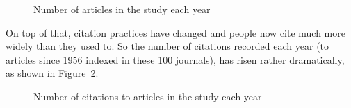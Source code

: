 \documentclass[
  10pt,
  letterpaper,
  DIV=11,
  numbers=noendperiod,
  twoside]{scrartcl}
\begin{document}
\begin{figure}


\caption{\label{fig-number-of-articles-by-year}Number of articles in the
study each year}

\end{figure}%

On top of that, citation practices have changed and people now cite much
more widely than they used to. So the number of citations recorded each
year (to articles since 1956 indexed in these 100 journals), has risen
rather dramatically, as shown in
Figure~\ref{fig-number-of-citations-by-year}.

\begin{figure}


\caption{\label{fig-number-of-citations-by-year}Number of citations to
articles in the study each year}

\end{figure}%
\end{document}
